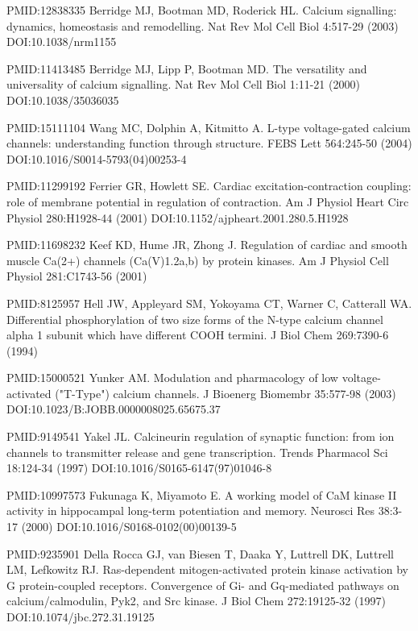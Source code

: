 \begin{thebibliography}{00}
PMID:12838335
 Berridge MJ, Bootman MD, Roderick HL.
\newblock Calcium signalling: dynamics, homeostasis and remodelling.
\newblock Nat Rev Mol Cell Biol 4:517-29 (2003) DOI:10.1038/nrm1155

PMID:11413485
 Berridge MJ, Lipp P, Bootman MD.
\newblock The versatility and universality of calcium signalling.
\newblock Nat Rev Mol Cell Biol 1:11-21 (2000) DOI:10.1038/35036035

PMID:15111104
 Wang MC, Dolphin A, Kitmitto A.
\newblock L-type voltage-gated calcium channels: understanding function through structure.
\newblock FEBS Lett 564:245-50 (2004) DOI:10.1016/S0014-5793(04)00253-4

PMID:11299192
 Ferrier GR, Howlett SE.
\newblock Cardiac excitation-contraction coupling: role of membrane potential in regulation of contraction.
\newblock Am J Physiol Heart Circ Physiol 280:H1928-44 (2001) DOI:10.1152/ajpheart.2001.280.5.H1928

PMID:11698232
 Keef KD, Hume JR, Zhong J.
\newblock Regulation of cardiac and smooth muscle Ca(2+) channels (Ca(V)1.2a,b) by protein kinases.
\newblock Am J Physiol Cell Physiol 281:C1743-56 (2001)

PMID:8125957
 Hell JW, Appleyard SM, Yokoyama CT, Warner C, Catterall WA.
\newblock Differential phosphorylation of two size forms of the N-type calcium channel alpha 1 subunit which have different COOH termini.
\newblock J Biol Chem 269:7390-6 (1994)

PMID:15000521
 Yunker AM.
\newblock Modulation and pharmacology of low voltage-activated ("T-Type") calcium channels.
\newblock J Bioenerg Biomembr 35:577-98 (2003) DOI:10.1023/B:JOBB.0000008025.65675.37

PMID:9149541
 Yakel JL.
\newblock Calcineurin regulation of synaptic function: from ion channels to transmitter release and gene transcription.
\newblock Trends Pharmacol Sci 18:124-34 (1997) DOI:10.1016/S0165-6147(97)01046-8

PMID:10997573
 Fukunaga K, Miyamoto E.
\newblock A working model of CaM kinase II activity in hippocampal long-term potentiation and memory.
\newblock Neurosci Res 38:3-17 (2000) DOI:10.1016/S0168-0102(00)00139-5

PMID:9235901
 Della Rocca GJ, van Biesen T, Daaka Y, Luttrell DK, Luttrell LM, Lefkowitz RJ.
\newblock Ras-dependent mitogen-activated protein kinase activation by G protein-coupled receptors. Convergence of Gi- and Gq-mediated pathways on calcium/calmodulin, Pyk2, and Src kinase.
\newblock J Biol Chem 272:19125-32 (1997) DOI:10.1074/jbc.272.31.19125


\end{thebibliography}
